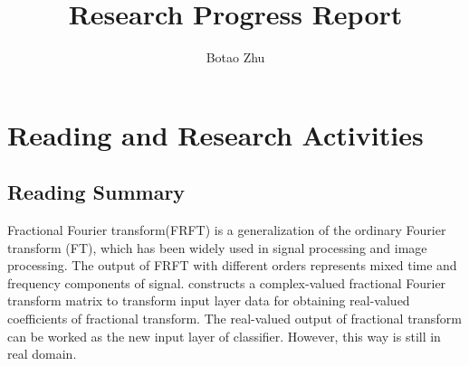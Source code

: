 \documentclass[11pt]{report}
\title{Research Progress Report}
\author{Botao Zhu}
\begin{document}
	
	\maketitle
	 \chead{} 
	 \cfoot{} 
	\renewcommand{\footrulewidth}{1.0pt}
	\renewcommand{\headrulewidth}{2.0pt}
	\renewcommand{\arraystretch}{1.3}
	\pagestyle{fancy}
	
	\renewcommand{\thesection}{\arabic{section}}
	
	\section{Reading and Research Activities}
	
	\subsection{Reading Summary}
	
	
	\noindent Fractional Fourier transform(FRFT) is a generalization of the ordinary Fourier transform (FT), which has been widely used in signal processing and image processing. The output of FRFT with different orders represents mixed time and frequency components of signal. \cite{8492732} constructs a complex-valued fractional Fourier transform matrix to transform input layer data for obtaining real-valued coefficients of fractional transform. The real-valued output of fractional transform can be worked as the new input layer of classifier. However, this way is still in real domain.\\
	
\end{document}
